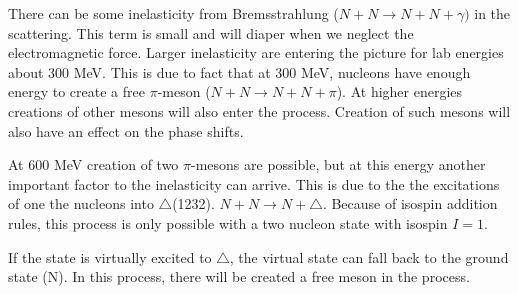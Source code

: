 \label{chap:NN-scattering up to 1 GeV}


There can be some inelasticity from Bremsstrahlung ($N+N\to N+N+\gamma)$ in the scattering.
This term is small and will diaper when we neglect the electromagnetic force. Larger inelasticity
are entering the picture for lab energies about 300 MeV.
This is due to
fact that at 300 MeV, nucleons have enough energy to create a free $\pi$-meson ($N+N\to N+N+\pi$).
At higher
energies creations of other mesons will also enter the process.
Creation of such mesons will also have an effect on the phase shifts.

At 600 MeV creation of two $\pi$-mesons are possible, but at this energy another important factor to the inelasticity
can arrive.
This is due to the the excitations of one the nucleons into $\triangle$(1232).
$N+N\to N+\triangle$. 
Because of isospin addition rules, this process is only possible with a two nucleon state with isospin $I=1$.

If the state is virtually excited to $\triangle$, the virtual state can fall back to the ground state (N). In this process,
there will be created a free meson in the process.

